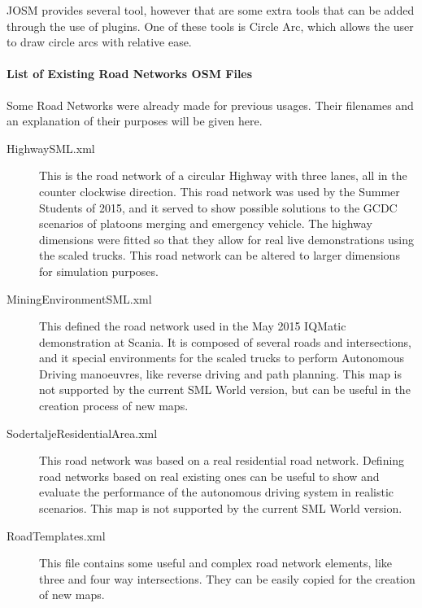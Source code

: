 JOSM provides several tool, however that are some extra tools that can be added through the use of plugins. One of these tools is Circle Arc, which allows the user to draw circle arcs with relative ease.


\paragraph{List of Existing Road Networks OSM Files}

Some Road Networks were already made for previous usages. Their filenames and an explanation of their purposes will be given here.

\begin{description}

\item[HighwaySML.xml] This is the road network of a circular Highway with three lanes, all in the counter clockwise direction. This road network was used by the Summer Students of 2015, and it served to show possible solutions to the GCDC scenarios of platoons merging and emergency vehicle. The highway dimensions were fitted so that they allow for real live demonstrations using the scaled trucks. This road network can be altered to larger dimensions for simulation purposes.
\item[MiningEnvironmentSML.xml] This defined the road network used in the May 2015 IQMatic demonstration at Scania. It is composed of several roads and intersections, and it special environments for the scaled trucks to perform Autonomous Driving manoeuvres, like reverse driving and path planning. This map is not supported by the current SML World version, but can be useful in the creation process of new maps.
\item[SodertaljeResidentialArea.xml] This road network was based on a real residential road network. Defining road networks based on real existing ones can be useful to show and evaluate the performance of the autonomous driving system in realistic scenarios. This map is not supported by the current SML World version.
\item[RoadTemplates.xml] This file contains some useful and complex road network elements, like three and four way intersections. They can be easily copied for the creation of new maps.
\end{description}

